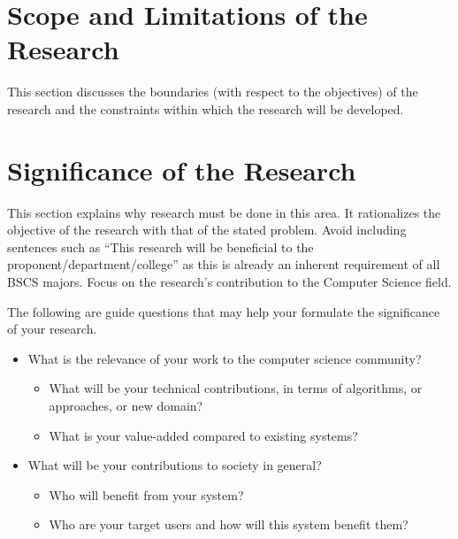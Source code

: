 \section{Scope and Limitations of the Research}
\label{sec:scopelimitations}

This section discusses the boundaries (with respect to the objectives) of the research and the constraints within 
which the research will be developed.

\begin{comment}

%
%
Generally, one paragraph should be allotted for each of your research objectives.

Each paragraph contains a brief overview of the concept/theory and the purpose of doing the associated objective.

Each paragraph also includes a description of the scope/limitation of your study.

* Please refer to the slides for examples.

\end{comment}


\section{Significance of the Research}
\label{sec:significance}

This section explains why research must be done in this area.
 It rationalizes the objective of the research with that of the stated problem. 
 Avoid including sentences such as ``This research will be beneficial to the proponent/department/college'' as this is already an inherent requirement of all BSCS majors.  Focus on the research's contribution to the Computer Science field.

The following are guide questions that may help your formulate the significance of your research. 


%
%
\begin{itemize}
\item  What is the relevance of your work to the computer science community? 

\begin{itemize} 
\item What will be your technical contributions, in terms of algorithms, or approaches, or new domain? 
\item What is your value-added compared to existing systems? 
\end{itemize}

\item What will be your contributions to society in general? 
    \begin{itemize}
      \item Who will benefit from your system? 
      \item Who are your target users and how will this system benefit them? 
   \end{itemize}
\end{itemize}

\begin{comment}
If applicable, describe possible commercialization and/or innovation in your research.
\end{comment}


